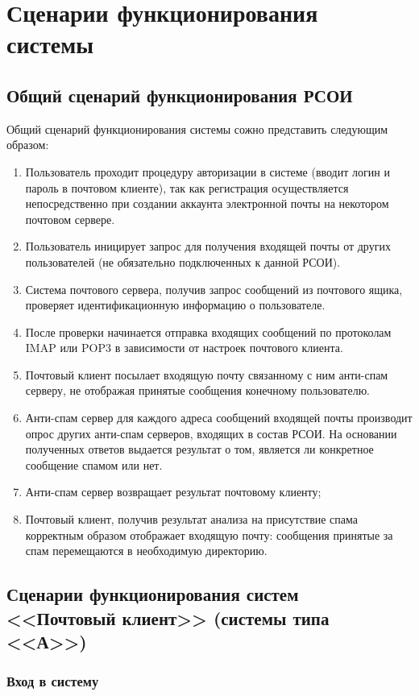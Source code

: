 \section{Сценарии функционирования системы}
\subsection{Общий сценарий функционирования РСОИ}
Общий сценарий функционирования системы сожно представить следующим образом:

\begin{enumerate}
  \item Пользователь проходит процедуру авторизации в системе (вводит логин и пароль в почтовом клиенте), так как регистрация осуществляется непосредственно при создании аккаунта электронной почты на некотором почтовом сервере.
  \item Пользователь иницирует запрос для получения входящей почты от других пользователей (не обязательно подключенных к данной РСОИ).
  \item Система почтового сервера, получив запрос сообщений из почтового ящика, проверяет идентификационную информацию о пользователе.
  \item После проверки начинается отправка входящих сообщений по протоколам IMAP или POP3 в зависимости от настроек почтового клиента.
  \item Почтовый клиент посылает входящую почту связанному с ним анти-спам серверу, не отображая принятые сообщения конечному пользователю.
  \item Анти-спам сервер для каждого адреса сообщений входящей почты производит опрос других анти-спам серверов, входящих в состав РСОИ. На основании полученных ответов выдается результат о том, является ли конкретное сообщение спамом или нет.
  \item Анти-спам сервер возвращает результат почтовому клиенту;
  \item Почтовый клиент, получив результат анализа на присутствие спама корректным образом отображает входящую почту: сообщения принятые за спам перемещаются в необходимую директорию.
\end{enumerate}

\subsection{Сценарии функционирования систем <<Почтовый клиент>> (системы типа <<А>>)}

\subsubsection{Вход в систему}

